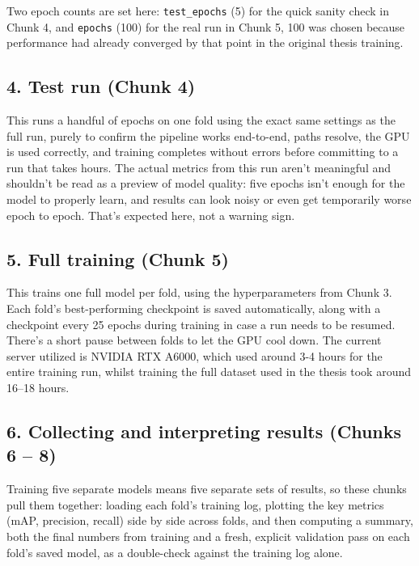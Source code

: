 \documentclass[
]{book}
\begin{document}
Two epoch counts are set here: \texttt{test\_epochs} (5) for the quick sanity check in Chunk 4, and \texttt{epochs} (100) for the real run in Chunk 5, 100 was chosen because performance had already converged by that point in the original thesis training.

\subsection*{4. Test run (Chunk 4)}\label{test-run-chunk-4}

This runs a handful of epochs on one fold using the exact same settings as the full run, purely to confirm the pipeline works end-to-end, paths resolve, the GPU is used correctly, and training completes without errors before committing to a run that takes hours. The actual metrics from this run aren't meaningful and shouldn't be read as a preview of model quality: five epochs isn't enough for the model to properly learn, and results can look noisy or even get temporarily worse epoch to epoch. That's expected here, not a warning sign.

\subsection*{5. Full training (Chunk 5)}\label{full-training-chunk-5}

This trains one full model per fold, using the hyperparameters from Chunk 3. Each fold's best-performing checkpoint is saved automatically, along with a checkpoint every 25 epochs during training in case a run needs to be resumed. There's a short pause between folds to let the GPU cool down. The current server utilized is NVIDIA RTX A6000, which used around 3-4 hours for the entire training run, whilst training the full dataset used in the thesis took around 16--18 hours.

\subsection*{6. Collecting and interpreting results (Chunks 6 -- 8)}\label{collecting-and-interpreting-results-chunks-6-8}

Training five separate models means five separate sets of results, so these chunks pull them together: loading each fold's training log, plotting the key metrics (mAP, precision, recall) side by side across folds, and then computing a summary, both the final numbers from training and a fresh, explicit validation pass on each fold's saved model, as a double-check against the training log alone.
\end{document}
